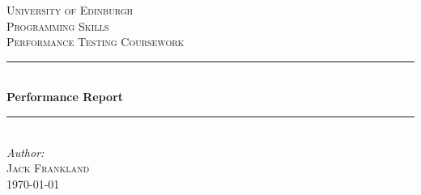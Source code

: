 \begin{titlepage}

\newcommand{\HRule}{\rule{\linewidth}{0.5mm}} %

\center %
 

\textsc{\LARGE University of Edinburgh}\\[1.5cm] %
\textsc{\Large Programming Skills}\\[0.5cm] %
\textsc{\large Performance Testing Coursework}\\[0.5cm] %


\HRule \\[0.4cm]
{ \huge \bfseries Performance Report}\\[0.4cm] %
\HRule \\[1.5cm]
 



\Large \emph{Author:}\\
\textsc{Jack Frankland}\\[3cm] %


{\large \today}\\[2cm] %



\end{titlepage}
